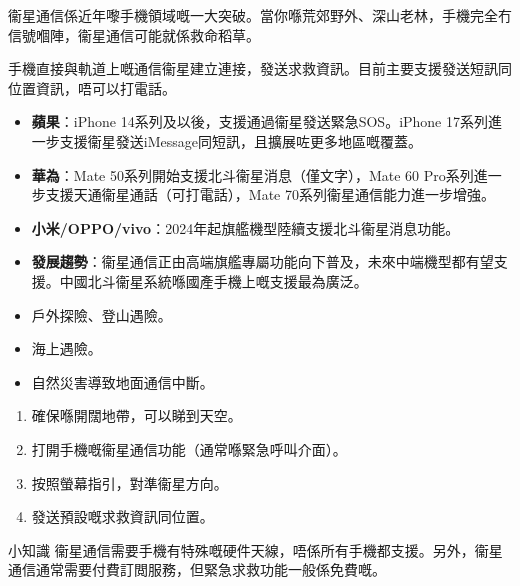 


衞星通信係近年嚟手機領域嘅一大突破。當你喺荒郊野外、深山老林，手機完全冇信號嗰陣，衞星通信可能就係救命稻草。


手機直接與軌道上嘅通信衞星建立連接，發送求救資訊。目前主要支援發送短訊同位置資訊，唔可以打電話。


\begin{itemize}
  \item \textbf{蘋果}：iPhone 14系列及以後，支援通過衞星發送緊急SOS。iPhone 17系列進一步支援衞星發送iMessage同短訊，且擴展咗更多地區嘅覆蓋。
  \item \textbf{華為}：Mate 50系列開始支援北斗衞星消息（僅文字），Mate 60 Pro系列進一步支援天通衞星通話（可打電話），Mate 70系列衞星通信能力進一步增強。
  \item \textbf{小米/OPPO/vivo}：2024年起旗艦機型陸續支援北斗衞星消息功能。
  \item \textbf{發展趨勢}：衞星通信正由高端旗艦專屬功能向下普及，未來中端機型都有望支援。中國北斗衞星系統喺國產手機上嘅支援最為廣泛。
\end{itemize}


\begin{itemize}
  \item 戶外探險、登山遇險。
  \item 海上遇險。
  \item 自然災害導致地面通信中斷。
\end{itemize}


\begin{enumerate}
  \item 確保喺開闊地帶，可以睇到天空。
  \item 打開手機嘅衞星通信功能（通常喺緊急呼叫介面）。
  \item 按照螢幕指引，對準衞星方向。
  \item 發送預設嘅求救資訊同位置。
\end{enumerate}

\begin{tcbinfo}{小知識}
衞星通信需要手機有特殊嘅硬件天線，唔係所有手機都支援。另外，衞星通信通常需要付費訂閲服務，但緊急求救功能一般係免費嘅。

\end{tcbinfo}

